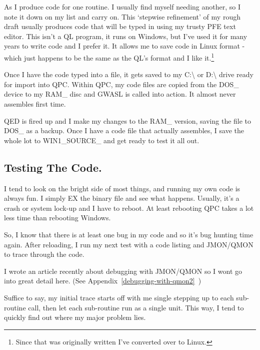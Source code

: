 As I produce code for one routine. I usually find myself needing
      another, so I note it down on my list and carry on. This `stepwise
      refinement' of my rough draft usually produces code that will be typed
      in using my trusty PFE text editor. This isn't a QL program, it runs on
      Windows, but I've used it for many years to write code and I prefer it.
      It allows me to save code in Linux format -{} which just happens to be the
      same as the QL's format and I like it.\footnote{Since that was originally written I've converted over to Linux.}

Once I have the code typed into a file, it gets saved to my C:\textbackslash{} or
      D:\textbackslash{} drive ready for import into QPC. Within QPC, my code files are
      copied from the DOS\_ device to my RAM\_ disc and GWASL is called into
      action. It almost never assembles first time.

QED is fired up and I make my changes to the RAM\_ version, saving
      the file to DOS\_ as a backup. Once I have a code file that actually
      assembles, I save the whole lot to WIN1\_SOURCE\_ and get ready to test it
      all out.

\subsection{Testing The Code.}
\label{ch14-testing}%

I tend to look on the bright side of most things, and running my
      own code is always fun. I simply EX the binary file and see what
      happens. Usually, it's a crash or system lock-{}up and I have to reboot.
      At least rebooting QPC takes a lot less time than rebooting
      Windows.

So, I know that there is at least one bug in my code and so it's
      bug hunting time again. After reloading, I run my next test with a code
      listing and JMON/QMON to trace through the code.

I wrote an article recently about debugging with JMON/QMON so I
      wont go into great detail here. (See Appendix~\ref{debugging-with-qmon2}~)

Suffice to say, my initial trace starts
      off with me single stepping up to each sub-{}routine call, then let each
      sub-{}routine run as a single unit. This way, I tend to quickly find out
      where my major problem lies.

